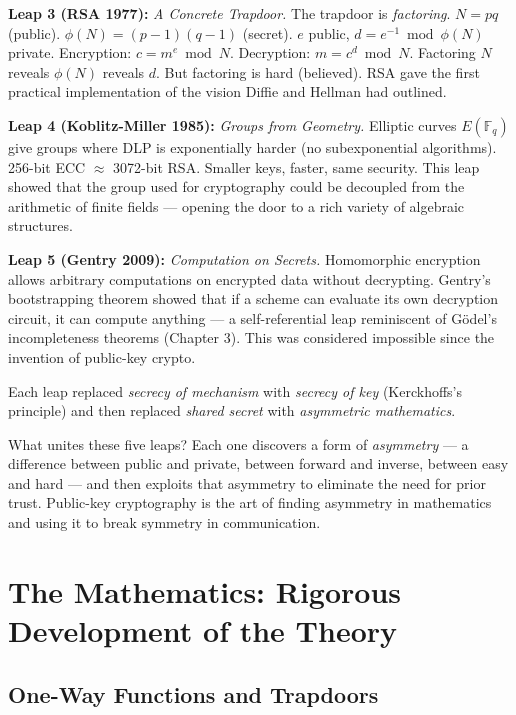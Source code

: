 \textbf{Leap 3 (RSA 1977):} \emph{A Concrete Trapdoor.} The trapdoor is \emph{factoring}. $N = pq$ (public). $\phi(N) = (p-1)(q-1)$ (secret). $e$ public, $d = e^{-1} \bmod \phi(N)$ private. Encryption: $c = m^e \bmod N$. Decryption: $m = c^d \bmod N$. Factoring $N$ reveals $\phi(N)$ reveals $d$. But factoring is hard (believed). RSA gave the first practical implementation of the vision Diffie and Hellman had outlined.

\textbf{Leap 4 (Koblitz-Miller 1985):} \emph{Groups from Geometry.} Elliptic curves $E(\mathbb{F}_q)$ give groups where DLP is exponentially harder (no subexponential algorithms). 256-bit ECC $\approx$ 3072-bit RSA. Smaller keys, faster, same security. This leap showed that the group used for cryptography could be decoupled from the arithmetic of finite fields — opening the door to a rich variety of algebraic structures.

\textbf{Leap 5 (Gentry 2009):} \emph{Computation on Secrets.} Homomorphic encryption allows arbitrary computations on encrypted data without decrypting. Gentry's bootstrapping theorem showed that if a scheme can evaluate its own decryption circuit, it can compute anything — a self-referential leap reminiscent of Gödel's incompleteness theorems (Chapter 3). This was considered impossible since the invention of public-key crypto.

Each leap replaced \emph{secrecy of mechanism} with \emph{secrecy of key} (Kerckhoffs's principle) and then replaced \emph{shared secret} with \emph{asymmetric mathematics}.

What unites these five leaps? Each one discovers a form of \emph{asymmetry} — a difference between public and private, between forward and inverse, between easy and hard — and then exploits that asymmetry to eliminate the need for prior trust. Public-key cryptography is the art of finding asymmetry in mathematics and using it to break symmetry in communication.

\section{The Mathematics: Rigorous Development of the Theory}
\label{sec:crypto:math}

\subsection{One-Way Functions and Trapdoors}
\label{sec:crypto:owf}


